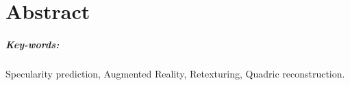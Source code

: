 \chapter*{Abstract}


\paragraph{Key-words:} Specularity prediction, Augmented Reality, Retexturing, Quadric reconstruction.


